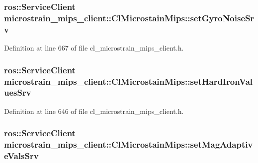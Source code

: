 \subsubsection[{\texorpdfstring{set\+Gyro\+Noise\+Srv}{setGyroNoiseSrv}}]{\setlength{\rightskip}{0pt plus 5cm}ros\+::\+Service\+Client microstrain\+\_\+mips\+\_\+client\+::\+Cl\+Microstain\+Mips\+::set\+Gyro\+Noise\+Srv\hspace{0.3cm}{\ttfamily [protected]}}\hypertarget{classmicrostrain__mips__client_1_1ClMicrostainMips_a062ecab1da692e2205636e081dc7b107}{}\label{classmicrostrain__mips__client_1_1ClMicrostainMips_a062ecab1da692e2205636e081dc7b107}


Definition at line 667 of file cl\+\_\+microstrain\+\_\+mips\+\_\+client.\+h.

\subsubsection[{\texorpdfstring{set\+Hard\+Iron\+Values\+Srv}{setHardIronValuesSrv}}]{\setlength{\rightskip}{0pt plus 5cm}ros\+::\+Service\+Client microstrain\+\_\+mips\+\_\+client\+::\+Cl\+Microstain\+Mips\+::set\+Hard\+Iron\+Values\+Srv\hspace{0.3cm}{\ttfamily [protected]}}\hypertarget{classmicrostrain__mips__client_1_1ClMicrostainMips_a998f8ed1540e2170aeaf8b47b6cb6e5e}{}\label{classmicrostrain__mips__client_1_1ClMicrostainMips_a998f8ed1540e2170aeaf8b47b6cb6e5e}


Definition at line 646 of file cl\+\_\+microstrain\+\_\+mips\+\_\+client.\+h.

\subsubsection[{\texorpdfstring{set\+Mag\+Adaptive\+Vals\+Srv}{setMagAdaptiveValsSrv}}]{\setlength{\rightskip}{0pt plus 5cm}ros\+::\+Service\+Client microstrain\+\_\+mips\+\_\+client\+::\+Cl\+Microstain\+Mips\+::set\+Mag\+Adaptive\+Vals\+Srv\hspace{0.3cm}{\ttfamily [protected]}}\hypertarget{classmicrostrain__mips__client_1_1ClMicrostainMips_a912d08b51a2ca485661ad28423d25bb3}{}\label{classmicrostrain__mips__client_1_1ClMicrostainMips_a912d08b51a2ca485661ad28423d25bb3}


